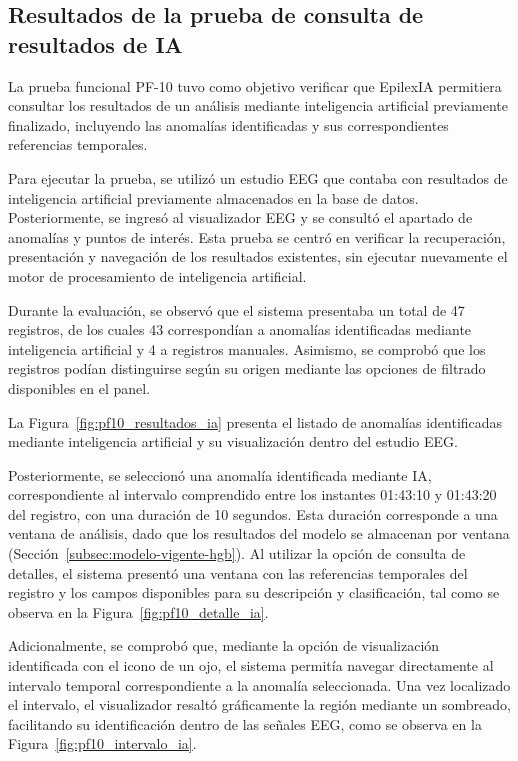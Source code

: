 \FloatBarrier


\subsection{Resultados de la prueba de consulta de resultados de IA}

La prueba funcional PF-10 tuvo como objetivo verificar que EpilexIA permitiera consultar los resultados de un análisis mediante inteligencia artificial previamente finalizado, incluyendo las anomalías identificadas y sus correspondientes referencias temporales.


Para ejecutar la prueba, se utilizó un estudio EEG que contaba con resultados de inteligencia artificial previamente almacenados en la base de datos. Posteriormente, se ingresó al visualizador EEG y se consultó el apartado de anomalías y puntos de interés. Esta prueba se centró en verificar la recuperación, presentación y navegación de los resultados existentes, sin ejecutar nuevamente el motor de procesamiento de inteligencia artificial.


Durante la evaluación, se observó que el sistema presentaba un total de 47 registros, de los cuales 43 correspondían a anomalías identificadas mediante inteligencia artificial y 4 a registros manuales. Asimismo, se comprobó que los registros podían distinguirse según su origen mediante las opciones de filtrado disponibles en el panel.


La Figura~\ref{fig:pf10_resultados_ia} presenta el listado de anomalías identificadas mediante inteligencia artificial y su visualización dentro del estudio EEG.

Posteriormente, se seleccionó una anomalía identificada mediante IA, correspondiente al intervalo comprendido entre los instantes 01:43:10 y 01:43:20 del registro, con una duración de 10 segundos. Esta duración corresponde a una ventana de análisis, dado que los resultados del modelo se almacenan por ventana (Sección~\ref{subsec:modelo-vigente-hgb}). Al utilizar la opción de consulta de detalles, el sistema presentó una ventana con las referencias temporales del registro y los campos disponibles para su descripción y clasificación, tal como se observa en la Figura~\ref{fig:pf10_detalle_ia}.

Adicionalmente, se comprobó que, mediante la opción de visualización identificada con el icono de un ojo, el sistema permitía navegar directamente al intervalo temporal correspondiente a la anomalía seleccionada. Una vez localizado el intervalo, el visualizador resaltó gráficamente la región mediante un sombreado, facilitando su identificación dentro de las señales EEG, como se observa en la Figura~\ref{fig:pf10_intervalo_ia}.

